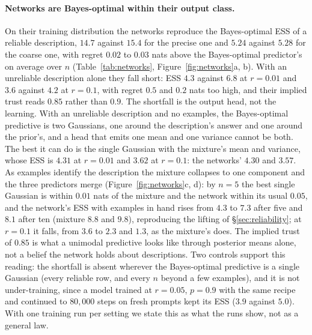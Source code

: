 \documentclass[10pt]{article}
\begin{document}
\paragraph{Networks are Bayes-optimal within their output class.}
On their training distribution the networks reproduce the Bayes-optimal ESS of a reliable description, $14.7$ against $15.4$ for the precise one and $5.24$ against $5.28$ for the coarse one, with regret $0.02$ to $0.03$ nats above the Bayes-optimal predictor's on average over $n$ (Table~\ref{tab:networks}, Figure~\ref{fig:networks}a, b). With an unreliable description alone they fall short: ESS $4.3$ against $6.8$ at $r = 0.01$ and $3.6$ against $4.2$ at $r = 0.1$, with regret $0.5$ and $0.2$ nats too high, and their implied trust reads $0.85$ rather than $0.9$. The shortfall is the output head, not the learning. With an unreliable description and no examples, the Bayes-optimal predictive is two Gaussians, one around the description's answer and one around the prior's, and a head that emits one mean and one variance cannot be both. The best it can do is the single Gaussian with the mixture's mean and variance, whose ESS is $4.31$ at $r = 0.01$ and $3.62$ at $r = 0.1$: the networks' $4.30$ and $3.57$. As examples identify the description the mixture collapses to one component and the three predictors merge (Figure~\ref{fig:networks}c, d): by $n = 5$ the best single Gaussian is within $0.01$ nats of the mixture and the network within its usual $0.05$, and the network's ESS with examples in hand rises from $4.3$ to $7.3$ after five and $8.1$ after ten (mixture $8.8$ and $9.8$), reproducing the lifting of \S\ref{sec:reliability}; at $r = 0.1$ it falls, from $3.6$ to $2.3$ and $1.3$, as the mixture's does. The implied trust of $0.85$ is what a unimodal predictive looks like through posterior means alone, not a belief the network holds about descriptions. Two controls support this reading: the shortfall is absent wherever the Bayes-optimal predictive is a single Gaussian (every reliable row, and every $n$ beyond a few examples), and it is not under-training, since a model trained at $r = 0.05$, $p = 0.9$ with the same recipe and continued to $80{,}000$ steps on fresh prompts kept its ESS ($3.9$ against $5.0$). With one training run per setting we state this as what the runs show, not as a general law.
\end{document}
